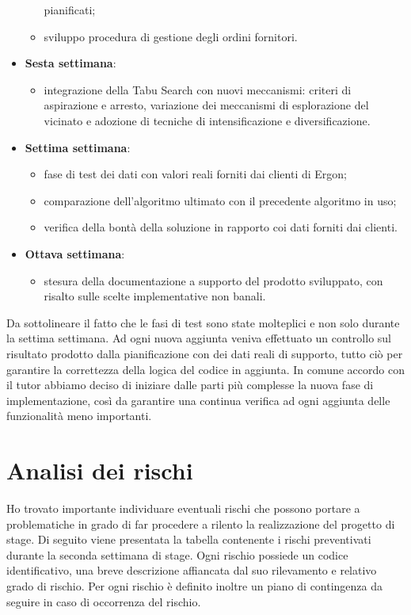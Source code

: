 \begin{itemize}
\begin{itemize}
		pianificati;
			\item sviluppo procedura di gestione degli ordini fornitori.
		\end{itemize}
	\item \textbf{Sesta settimana}:
		\begin{itemize}
		\item integrazione della Tabu Search con nuovi meccanismi:
		criteri di aspirazione e arresto, variazione dei
		meccanismi di esplorazione del vicinato e adozione di
		tecniche di intensificazione e diversificazione.
		\end{itemize}
	\item \textbf{Settima settimana}:
		\begin{itemize}
		\item fase di test dei dati con valori reali forniti dai clienti di Ergon;
		\item comparazione dell'algoritmo ultimato con il precedente algoritmo in uso;
		\item verifica della bontà della soluzione in rapporto coi dati forniti dai clienti.
		\end{itemize}
	\item \textbf{Ottava settimana}:
		\begin{itemize}
		\item stesura della documentazione a supporto del prodotto sviluppato, con risalto sulle scelte implementative non banali.
		\end{itemize}
\end{itemize}

Da sottolineare il fatto che le fasi di test sono state molteplici e non solo durante la settima settimana. Ad ogni nuova aggiunta veniva effettuato un controllo sul risultato prodotto dalla pianificazione con dei dati reali di supporto, tutto ciò per garantire la correttezza della logica del codice in aggiunta. In comune accordo con il tutor abbiamo deciso di iniziare dalle parti più complesse la nuova fase di implementazione, così da garantire una continua verifica ad ogni aggiunta delle funzionalità meno importanti.

\pagebreak
\section{Analisi dei rischi}
Ho trovato importante individuare eventuali rischi che possono portare a problematiche in grado di far procedere a rilento la realizzazione del progetto di stage.
Di seguito viene presentata la tabella contenente i rischi preventivati durante la seconda settimana di stage. Ogni rischio possiede un codice identificativo, una breve descrizione affiancata dal suo rilevamento e relativo grado di rischio. Per ogni rischio è definito inoltre un piano di contingenza da seguire in caso di occorrenza del rischio.


